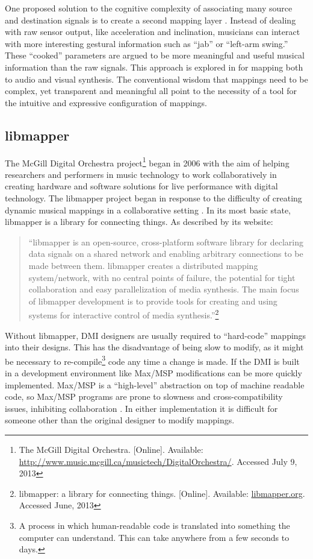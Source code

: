 One proposed solution to the cognitive complexity of associating many source and destination signals is to create a second mapping layer . Instead of dealing with raw sensor output, like acceleration and inclination, musicians can interact with more interesting gestural information such as ``jab'' or ``left-arm swing.'' These ``cooked'' parameters are argued to be more meaningful and useful musical information than the raw signals. This approach is explored in  for mapping both to audio and visual synthesis. The conventional wisdom that mappings need to be complex, yet transparent and meaningful all point to the necessity of a tool for the intuitive and expressive configuration of mappings.

\subsection{libmapper}

The McGill Digital Orchestra project\footnote{The McGill Digital Orchestra. [Online]. Available: \url{http://www.music.mcgill.ca/musictech/DigitalOrchestra/}. Accessed July 9, 2013} began in 2006 with the aim of helping researchers  and performers in music technology to work collaboratively in creating hardware and software solutions for live performance with digital technology. The libmapper project began in response to the difficulty of creating dynamic musical mappings in a collaborative setting . In its most basic state, libmapper is a library for connecting things. As described by its website: 

\begin{quote} 
``libmapper is an open-source, cross-platform software library for declaring data signals on a shared network and enabling arbitrary connections to be made between them. libmapper creates a distributed mapping system/network, with no central points of failure, the potential for tight collaboration and easy parallelization of media synthesis. The main focus of libmapper development is to provide tools for creating and using systems for interactive control of media synthesis.''\footnote{libmapper: a library for connecting things. [Online]. Available: \url{libmapper.org}. Accessed June, 2013}
\end{quote}

Without libmapper, DMI designers are usually required to ``hard-code'' mappings into their designs. This has the disadvantage of being slow to modify, as it might be necessary to re-compile\footnote{A process in which human-readable code is translated into something the computer can understand. This can take anywhere from a few seconds to days.} code any time a change is made. If the DMI is built in a development environment like Max/MSP modifications can be more quickly implemented. Max/MSP is a ``high-level'' abstraction on top of machine readable code, so Max/MSP programs are prone to slowness and cross-compatibility issues, inhibiting collaboration . In either implementation it is difficult for someone other than the original designer to modify mappings.

